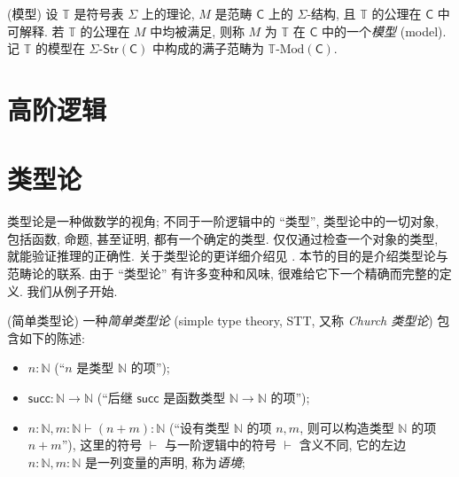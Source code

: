 \begin{definition}
	{(模型)}
	设 $\mathbb T$ 是符号表 $\Sigma$ 上的理论, $M$ 是范畴 $\mathsf C$ 上的 $\Sigma$-结构,
	且 $\mathbb T$ 的公理在 $\mathsf C$ 中可解释.
	若 $\mathbb T$ 的公理在 $M$ 中均被满足, 则称 $M$ 为 $\mathbb T$ 在 $\mathsf C$ 中的一个\emph{模型} (model).
	记 $\mathbb T$ 的模型在 $\Sigma\text{-}\mathsf{Str}(\mathsf C)$ 中构成的满子范畴为 $\mathbb T\text{-Mod}(\mathsf C)$.
\end{definition}

\section{高阶逻辑}

\todo{}

\section{类型论}

\label{appendix-type-theory}


类型论是一种做数学的视角; 不同于一阶逻辑中的 ``类型'', 类型论中的一切对象, 包括函数, 命题, 甚至证明, 都有一个确定的类型. 仅仅通过检查一个对象的类型, 就能验证推理的正确性. 关于类型论的更详细介绍见 \cite{Trebor-History}. 本节的目的是介绍类型论与范畴论的联系.
由于 ``类型论'' 有许多变种和风味, 很难给它下一个精确而完整的定义. 我们从例子开始.

\begin{example}
	{(简单类型论)}
	一种\emph{简单类型论} (simple type theory, STT, 又称 \emph{Church 类型论}) 包含如下的陈述:
	\begin{itemize}
		\item $n\colon \mathbb{N}$ (``$n$ 是类型 $\mathbb{N}$ 的项'');
		\item $\mathsf {succ}\colon \mathbb{N}\to\mathbb{N}$ (``后继 $\mathsf {succ}$ 是函数类型 $\mathbb{N}\to\mathbb{N}$ 的项'');
		\item $n\colon \mathbb{N},m\colon \mathbb{N} \vdash (n+m) \colon \mathbb{N}$ (``设有类型 $\mathbb{N}$ 的项 $n,m$, 则可以构造类型 $\mathbb{N}$ 的项 $n+m$''), 这里的符号 $\vdash$ 与一阶逻辑中的符号 $\vdash$ 含义不同, 它的左边 $n\colon \mathbb{N},m\colon \mathbb{N}$ 是一列变量的声明, 称为\emph{语境};
	\end{itemize}
	
\end{example}

